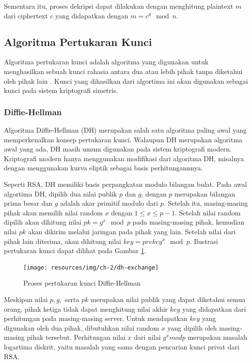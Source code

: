       Sementara itu, proses dekripsi dapat dilakukan dengan menghitung plaintext $m$ dari ciphertext $c$ yang didapatkan dengan $m = c^d \mod n$.


  \subsection{Algoritma Pertukaran Kunci}
    Algoritma pertukaran kunci adalah algoritma yang digunakan untuk menghasilkan sebuah kunci rahasia antara dua atau lebih pihak tanpa diketahui oleh pihak lain \citep{applied_crypto}. Kunci yang dihasilkan dari algortima ini akan digunakan sebagai kunci pada sistem kriptografi simetris.

    \subsubsection{Diffie-Hellman}
      Algoritma Diffie-Hellman (DH) merupakan salah satu algoritma paling awal yang memperkenalkan konsep pertukaran kunci. Walaupun DH merupakan algoritma awal yang ada, DH masih umum digunakan pada sistem kriptografi modern. Kriptografi modern hanya menggunakan modifikasi dari algoritma DH, misalnya dengan menggunakan kurva eliptik sebagai basis perhitungannnya.

      Seperti RSA, DH memiliki basis perpangkatan modulo bilangan bulat. Pada awal algortima DH, dipilih dua nilai publik $p$ dan $g$, dengan $p$ merupakan bilangan prima besar dan $g$ adalah akar primitif modulo dari $p$. Setelah itu, masing-masing pihak akan memilih nilai random $x$ dengan $1 \leq x \leq p-1 $. Setelah nilai random dipilih akan dihitung nilai $pk = g^x \mod p$ pada masing-masing pihak, kemudian nilai $pk$ akan dikirim melalui jaringan pada pihak yang lain. Setelah nilai dari pihak lain diterima, akan dihitung nilai $key = prekey^x \mod p$. Ilustrasi pertukaran kunci dapat dilihat pada Gambar \ref{fig:dh_exchange}.

      \begin{figure}[h]
        \centering
        \texttt{[image: resources/img/ch-2/dh-exchange]}
        \caption{Proses pertukaran kunci Diffie-Hellman}
        \label{fig:dh_exchange}
      \end{figure}

      Meskipun nilai $p, g, $ serta $pk$ merupakan nilai publik yang dapat diketahui semua orang, pihak ketiga tidak dapat menghitung nilai akhir $key$ yang didapatkan dari perhitungan pada masing-masing server. Untuk mendapatkan $key$ yang digunakan oleh dua pihak, dibutuhkan nilai random $x$ yang dipilih oleh masing-masing pihak tersebut. Perhitungan nilai $x$ dari nilai $g^x mod p$ merupakan masalah logartima diskrit, yaitu masalah yang sama dengan pencarian kunci privat dari RSA.
